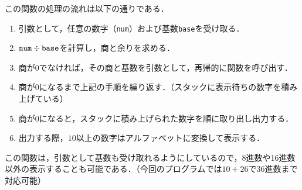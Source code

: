 \documentclass[a4j,11pt]{jarticle}
\begin{document}
この関数の処理の流れは以下の通りである．
\begin{enumerate}
      \item 引数として，任意の数字（{\tt num}）および基数{\tt base}を受け取る．
      \item ${\tt num}\div{\tt base}$を計算し，商と余りを求める．
      \item 商が$0$でなければ，その商と基数を引数として，再帰的に関数を呼び出す．
      \item 商が$0$になるまで上記の手順を繰り返す．（スタックに表示待ちの数字を積み上げている）
      \item 商が$0$になると，スタックに積み上げられた数字を順に取り出し出力する．
      \item 出力する際，$10$以上の数字はアルファベットに変換して表示する．
\end{enumerate}

この関数は，引数として基数も受け取れるようにしているので，8進数や16進数以外の表示することも可能である．（今回のプログラムでは$10 + 26$で36進数まで対応可能）
\end{document}
